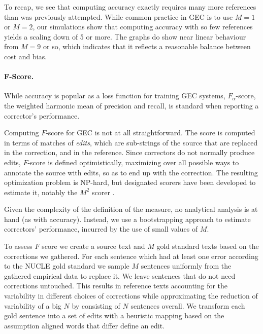 		To recap, we see that computing accuracy exactly requires many more references than was previously attempted.
		While common practice in GEC is to use $M=1$ or $M=2$, our simulations show that computing accuracy with
		so few references yields a scaling down of 5 or more. The graphs do show near linear behaviour from $M=9$ or
		so, which indicates that it reflects a reasonable balance between cost and bias.
		
		\paragraph{F-Score.}
		While accuracy is popular as a loss function for training GEC systems,
		$F_\alpha$-score, the weighted harmonic mean of precision and recall, is standard when reporting a corrector's performance.
		
		Computing $F$-score for GEC is not at all straightforward. The score is computed
		in terms of matches of {\it edits}, which are sub-strings of the source
		that are replaced in the correction, and in the reference. Since correctors
		do not normally produce edits, $F$-score is defined optimistically, maximizing
		over all possible ways to annotate the source with edits, so as to end up with the correction. 
		The resulting optimization problem is NP-hard, but designated scorers
		have been developed to estimate it, notably the $M^2$ scorer
		\cite{dahlmeier2012better}.
		
		Given the complexity of the definition of the measure, no analytical analysis is at hand (as with accuracy). Instead, we use a bootstrapping
		approach to estimate correctors' performance,
		incurred by the use of small values of $M$.
		
		To assess $F$ score we create a source text and $M$ gold standard texts based on the corrections we gathered.
		For each sentence which had at least one error according to the NUCLE gold standard we sample $M$ sentences uniformly from the
		gathered empirical data to replace it. We leave sentences that do not need corrections untouched. This results in reference texts accounting for the variability in different choices of corrections while approximating the reduction of variability of a big $N$ by consisting of $N$ sentences overall.
		We transform each gold sentence into a set of edits with a heuristic mapping based on the assumption aligned words that differ define an edit.
		
